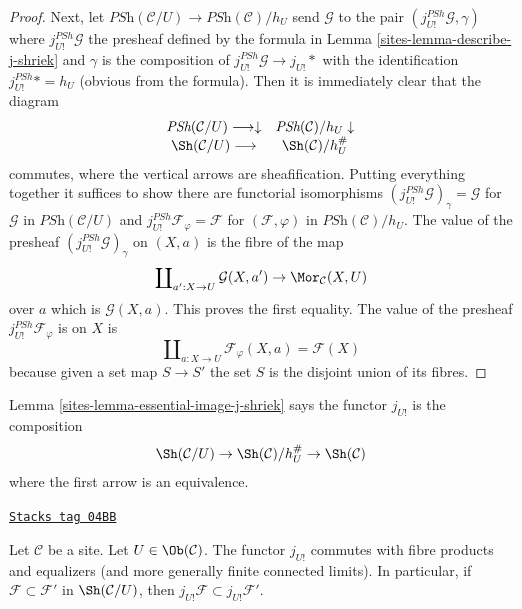 \begin{proof}
\medskip\noindent
Next, let $\textit{PSh}(\mathcal{C}/U) \to \textit{PSh}(\mathcal{C})/h_U$
send $\mathcal{G}$ to the pair $(j_{U!}^{PSh}\mathcal{G}, \gamma)$
where $j_{U!}^{PSh}\mathcal{G}$ the presheaf defined by the formula
in Lemma \ref{sites-lemma-describe-j-shriek} and $\gamma$ is the composition of
$j_{U!}^{PSh}\mathcal{G} \to j_{U!}*$ with the identification
$j_{U!}^{PSh}* = h_U$ (obvious from the formula).
Then it is immediately clear that the diagram
$$
\begin{array}{cc}\textit{PSh}(\mathcal{C}/U) \longrightarrow\downarrow & \textit{PSh}(\mathcal{C})/h_U \downarrow \\ \Sh(\mathcal{C}/U) \longrightarrow & \Sh(\mathcal{C})/h_U^\#\end{array}
$$
commutes, where the vertical arrows are sheafification.
Putting everything together it suffices to show there are
functorial isomorphisms $(j_{U!}^{PSh}\mathcal{G})_\gamma = \mathcal{G}$
for $\mathcal{G}$ in $\textit{PSh}(\mathcal{C}/U)$
and $j_{U!}^{PSh}\mathcal{F}_\varphi = \mathcal{F}$
for $(\mathcal{F}, \varphi)$ in $\textit{PSh}(\mathcal{C})/h_U$.
The value of the presheaf $(j_{U!}^{PSh}\mathcal{G})_\gamma$
on $(X, a)$ is the fibre of the map
$$
\coprod\nolimits_{a' : X \to U} \mathcal{G}(X, a') \to \Mor_\mathcal{C}(X, U)
$$
over $a$ which is $\mathcal{G}(X, a)$. This proves the first equality.
The value of the presheaf $j_{U!}^{PSh}\mathcal{F}_\varphi$ is
on $X$ is
$$
\coprod\nolimits_{a : X \to U} \mathcal{F}_\varphi(X, a) =
\mathcal{F}(X)
$$
because given a set map $S \to S'$ the set $S$ is the disjoint
union of its fibres.
\end{proof}

Lemma \ref{sites-lemma-essential-image-j-shriek}
says the functor $j_{U!}$ is the composition
$$
\Sh(\mathcal{C}/U) \rightarrow
\Sh(\mathcal{C})/h_U^\# \rightarrow
\Sh(\mathcal{C})
$$
where the first arrow is an equivalence.

\begin{lemma}
\label{sites-lemma-j-shriek-commutes-equalizers-fibre-products}
\href{https://stacks.math.columbia.edu/tag/04BB}{\texttt{Stacks tag 04BB}}

Let $\mathcal{C}$ be a site. Let $U \in \Ob(\mathcal{C})$.
The functor $j_{U!}$ commutes with fibre products and equalizers (and
more generally finite connected limits). In particular, if
$\mathcal{F} \subset \mathcal{F}'$ in $\Sh(\mathcal{C}/U)$, then
$j_{U!}\mathcal{F} \subset j_{U!}\mathcal{F}'$.
\end{lemma}

